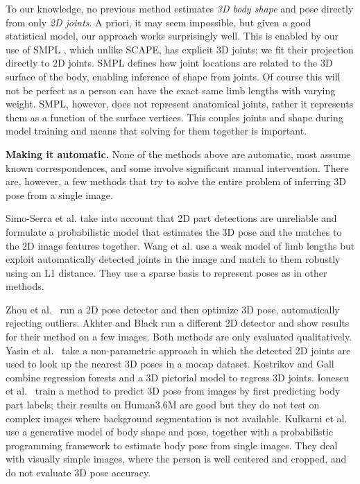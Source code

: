 \documentclass[runningheads]{llncs}
\begin{document}
To our knowledge, no previous method estimates {\em 3D body shape} and pose directly from only {\em 2D joints}.
A priori, it may seem impossible, but given a good statistical model, our approach works surprisingly well.
This is enabled by our use of SMPL \cite{SMPL:2015}, which unlike
SCAPE, has explicit 3D joints; we fit their projection directly to 2D joints.
SMPL defines how joint locations are related to the 3D surface of the
body, enabling inference of shape from joints.
Of course this will not be perfect as a person can have the exact same limb lengths with varying weight.
SMPL, however, does not represent anatomical joints, rather it represents them as a function of the surface vertices.
This couples joints and shape during model training and means that
solving for them together is important.

{\bf Making it automatic.}
None of the methods above are automatic, most assume known correspondences, and some involve significant manual intervention.
There are, however, a few methods that try to solve the entire problem of
inferring 3D pose from a single image.

Simo-Serra et al. \cite{Simoserra:2013,Simoserra:2012} take into account that 2D part detections are unreliable and formulate a probabilistic model that estimates the 3D pose and the matches to the 2D image features together.
Wang et al. \cite{Wang:2014} use a weak model of limb lengths
\cite{Lee1985} but exploit automatically detected joints in the image
and match to them robustly using an L1 distance.
They use a sparse basis to represent poses as in other methods.

Zhou et al.~\cite{Zhou:2014} run a 2D pose detector
\cite{YangCVPR11} and then optimize 3D pose, automatically rejecting outliers.
Akhter and Black \cite{Akhter:2015} run a different 2D detector
\cite{kiefel2014} and show results for their method on a few images.
Both methods are only evaluated qualitatively. 
Yasin et al.~\cite{Yasin:CVPR:2016} take a non-parametric approach in which the detected
  2D joints are used to look up the nearest 3D poses in a mocap
  dataset.
Kostrikov and Gall~\cite{Kostrikov:2014} combine regression forests and a 3D
  pictorial model to regress 3D joints.
Ionescu et al.~\cite{Ionescu:CVPR:2014} train a method to predict 3D
pose from images by first predicting body part labels; their results on
Human3.6M are good but they do not test on complex images where
background segmentation is not available.
Kulkarni et al.~\cite{Kulkarni_2015_CVPR} use a generative model of body shape
and pose, together with a probabilistic programming framework to
estimate body pose from single images.  They deal with visually simple
images, where the person is well centered and cropped, and do not evaluate 3D pose accuracy.
\end{document}
